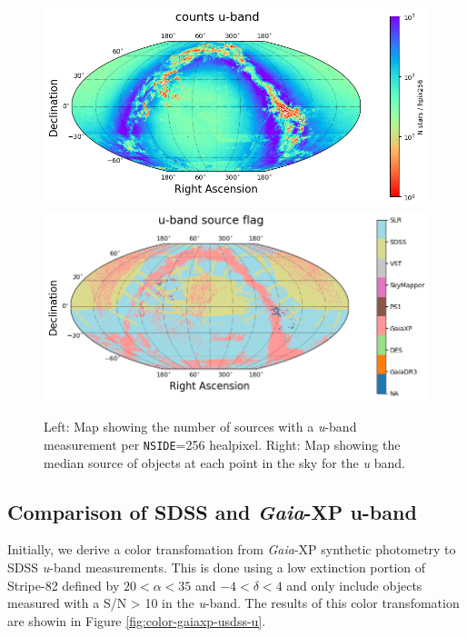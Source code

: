 \begin{figure}
    \includegraphics[width=0.48\linewidth]{./figures/source_density_maps/u-band_counts_full.png}
    \includegraphics[width=0.48\linewidth]{./figures/source_survey_maps/u-band_source.png}
    \caption{Left: Map showing the number of sources with a \textit{u}-band measurement per \texttt{NSIDE}=256 healpixel.
    Right: Map showing the median source of objects at each point in the sky for the \textit{u} band.}
    \label{fig:monster-u}
\end{figure}

\subsection{Comparison of SDSS and \emph{Gaia}-XP u-band}
Initially, we derive a color transfomation from \emph{Gaia}-XP synthetic photometry to SDSS \textit{u}-band measurements. 
This is done using a low extinction portion of Stripe-82 defined by $20 < \alpha < 35$ and $-4 < \delta < 4$ and only include objects measured with a S/N > 10 in the \textit{u}-band. 
The results of this color transfomation are showin in Figure \ref{fig:color-gaiaxp-usdss-u}. 

